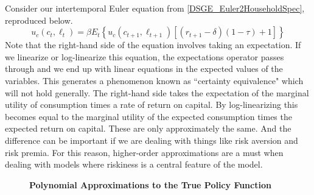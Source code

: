 \documentclass[letterpaper,12pt]{article}
\theoremstyle{definition}
\begin{document}
\begin{spacing}{1.5}
		Consider our intertemporal Euler equation from \eqref{DSGE_Euler2HouseholdSpec}, reproduced below.
		\begin{equation}
		u_c(c_t,\ell_t) = \beta E_t\left\{ u_c(c_{t+1},\ell_{t+1})[(r_{t+1}-\delta)(1-\tau)+1] \right\}
		\end{equation}
		Note that the right-hand side of the equation involves taking an expectation.  If we linearize or log-linearize this equation, the expectations operator passes through and we end up with linear equations in the expected values of the variables.  This generates a phenomenon known as ``certainty equivalence" which will not hold generally.  The right-hand side takes the expectation of the marginal utility of consumption times a rate of return on capital.  By log-linearizing this becomes equal to the marginal utility of the expected consumption times the expected return on capital.  These are only approximately the same.  And the difference can be important if we are dealing with things like risk aversion and risk premia.  For this reason, higher-order approximations are a must when dealing with models where riskiness is a central feature of the model.

		\begin{figure}[htb]\centering \captionsetup{width=4.0in}
			\label{DSGE_Poly_Fig}
		   \caption{\textbf{Polynomial Approximations to the True Policy Function}}
		\end{figure}


\end{spacing}
\end{document}
